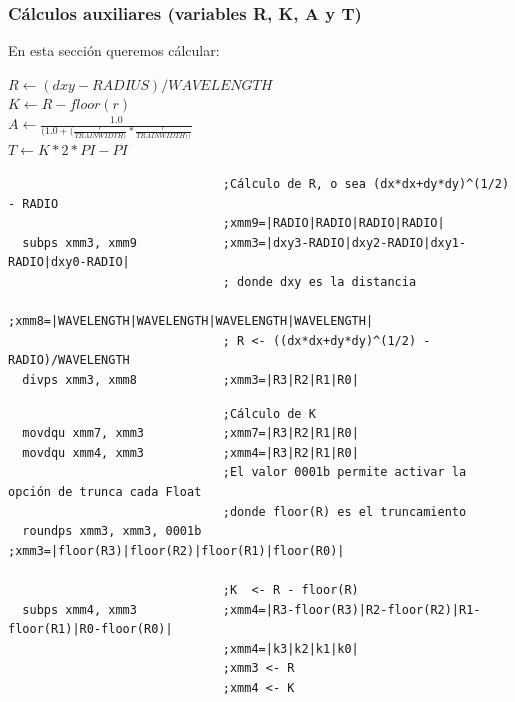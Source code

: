 \subsubsection*{Cálculos auxiliares (variables R, K, A y T)}

En esta sección queremos cálcular:

\begin{center}
	$R \gets (dxy-RADIUS)/WAVELENGTH$\\
	$K \gets R-floor(r)$ \\
	$A \gets \frac{1.0}{(1.0+(\frac{r}{TRAINWIDTH)}*\frac{r}{TRAINWIDTH))}}$ \\
	$T \gets K*2*PI-PI$
\end{center}

\begin{codesnippet}
\begin{verbatim}
                              ;Cálculo de R, o sea (dx*dx+dy*dy)^(1/2) - RADIO 
                              ;xmm9=|RADIO|RADIO|RADIO|RADIO|
  subps xmm3, xmm9            ;xmm3=|dxy3-RADIO|dxy2-RADIO|dxy1-RADIO|dxy0-RADIO|
                              ; donde dxy es la distancia
                              ;xmm8=|WAVELENGTH|WAVELENGTH|WAVELENGTH|WAVELENGTH|
                              ; R <- ((dx*dx+dy*dy)^(1/2) - RADIO)/WAVELENGTH
  divps xmm3, xmm8            ;xmm3=|R3|R2|R1|R0|	
\end{verbatim}
\end{codesnippet}
\begin{codesnippet}
\begin{verbatim}
                              ;Cálculo de K
  movdqu xmm7, xmm3           ;xmm7=|R3|R2|R1|R0|
  movdqu xmm4, xmm3           ;xmm4=|R3|R2|R1|R0|
                              ;El valor 0001b permite activar la opción de trunca cada Float
                              ;donde floor(R) es el truncamiento
  roundps xmm3, xmm3, 0001b   ;xmm3=|floor(R3)|floor(R2)|floor(R1)|floor(R0)|

                              ;K  <- R - floor(R)
  subps xmm4, xmm3            ;xmm4=|R3-floor(R3)|R2-floor(R2)|R1-floor(R1)|R0-floor(R0)|								
                              ;xmm4=|k3|k2|k1|k0|
                              ;xmm3 <- R
                              ;xmm4 <- K
\end{verbatim}
\end{codesnippet}
